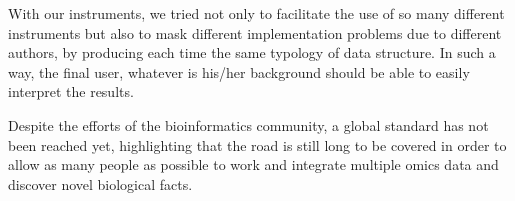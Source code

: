 With our instruments, we tried not only to facilitate the use of so many different instruments but also to mask different implementation problems due to different authors, by producing each time the same typology of data structure.
In such a way, the final user, whatever is his/her background should be able to easily interpret the results.

Despite the efforts of the bioinformatics community, a global standard has not been reached yet, highlighting that the road is still long to be covered in order to allow as many people as possible to work and integrate multiple omics data and discover novel biological facts.










